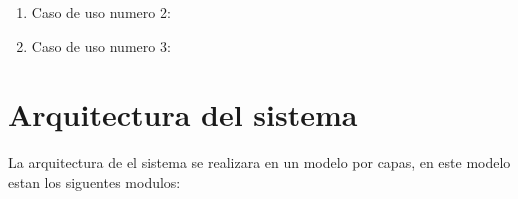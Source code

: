 \documentclass[12pt]{article}
\begin{document}
\begin{enumerate}
\item 
 Caso de uso numero 2:\\
\begin{center}
\end{center}
\item 
 Caso de uso numero 3:\\
\begin{center}
\end{center}
\end{enumerate}

\section{Arquitectura del sistema}
La arquitectura de el sistema se realizara en un modelo por capas, en este modelo estan los siguentes modulos:\\
\end{document}
